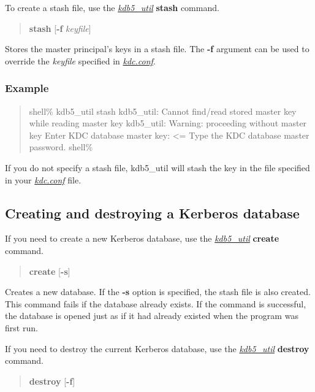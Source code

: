 \documentclass[letterpaper,10pt,english]{sphinxmanual}
\begin{document}
To create a stash file, use the {\hyperref[admin/admin_commands/kdb5_util:kdb5-util-8]{\emph{kdb5\_util}}} \textbf{stash} command.
\begin{quote}

\textbf{stash} {[}\textbf{-f} \emph{keyfile}{]}
\end{quote}

Stores the master principal's keys in a stash file.  The \textbf{-f}
argument can be used to override the \emph{keyfile} specified in
{\hyperref[admin/conf_files/kdc_conf:kdc-conf-5]{\emph{kdc.conf}}}.


\subsubsection{Example}
\label{admin/database:example}\begin{quote}

shell\% kdb5\_util stash
kdb5\_util: Cannot find/read stored master key while reading master key
kdb5\_util: Warning: proceeding without master key
Enter KDC database master key:  \textless{}= Type the KDC database master password.
shell\%
\end{quote}

If you do not specify a stash file, kdb5\_util will stash the key in
the file specified in your {\hyperref[admin/conf_files/kdc_conf:kdc-conf-5]{\emph{kdc.conf}}} file.


\subsection{Creating and destroying a Kerberos database}
\label{admin/database:creating-and-destroying-a-kerberos-database}
If you need to create a new Kerberos database, use the
{\hyperref[admin/admin_commands/kdb5_util:kdb5-util-8]{\emph{kdb5\_util}}} \textbf{create} command.
\begin{quote}

\textbf{create} {[}\textbf{-s}{]}
\end{quote}

Creates a new database.  If the \textbf{-s} option is specified, the stash
file is also created.  This command fails if the database already
exists.  If the command is successful, the database is opened just as
if it had already existed when the program was first run.

If you need to destroy the current Kerberos database, use the
{\hyperref[admin/admin_commands/kdb5_util:kdb5-util-8]{\emph{kdb5\_util}}} \textbf{destroy} command.
\begin{quote}

\textbf{destroy} {[}\textbf{-f}{]}
\end{quote}
\end{document}
